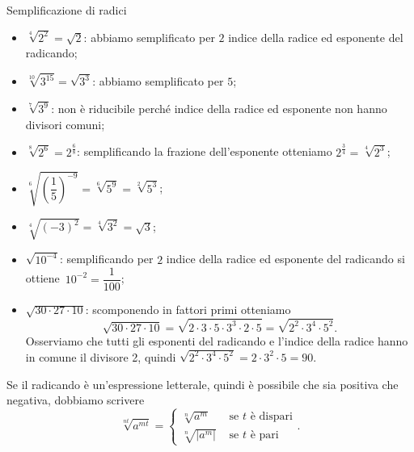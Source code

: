 \begin{exrig}
 \begin{esempio}
Semplificazione di radici
\begin{itemize}
 \item $\sqrt[4]{2^2}=\sqrt 2$: abbiamo semplificato per $2$ indice della radice ed esponente del radicando;
 \item $\sqrt[10]{3^{15}}=\sqrt{3^3}$: abbiamo semplificato per $5$;
 \item $\sqrt[7]{3^9}$: non è riducibile perché indice della radice ed esponente non hanno divisori comuni;
 \item $\sqrt[8]{2^6}=2^{\frac 6 8}$: semplificando la frazione dell'esponente otteniamo $2^{\frac 3 4}=\sqrt[4]{2^3}$;
 \item $\sqrt[6]{\left(\dfrac 1 5\right)^{-9}}=\sqrt[6]{5^9}=\sqrt[2]{5^3}$;
 \item $\sqrt[4]{(-3)^2}=\sqrt[4]{3^2}=\sqrt 3$;
 \item $\sqrt{10^{-4}}$: semplificando per $2$ indice della radice ed esponente del radicando si ottiene~$10^{-2}=\dfrac 1{100}$;
 \item $\sqrt{30\cdot 27\cdot 10}$: scomponendo in fattori primi otteniamo \[\sqrt{30\cdot 27\cdot 10}=\sqrt{2\cdot 3\cdot 5\cdot 3^3\cdot 2\cdot 5}=\sqrt{2^2\cdot 3^4\cdot 5^2}.\] Osserviamo che tutti gli esponenti del radicando e l'indice della radice hanno in comune il divisore 2, quindi $\sqrt{2^2\cdot 3^4\cdot 5^2}=2\cdot 3^2\cdot 5=90.$
\end{itemize}
\end{esempio}
\end{exrig}

Se il radicando è un'espressione letterale, quindi è possibile che sia positiva che negativa, dobbiamo scrivere
\[
\sqrt[nt]{a^{mt}}=
\begin{cases}
\sqrt[n]{a^m} & \text{ se }t\text{ è dispari}\\
\sqrt[n]{\left|a^m\right|} & \text{ se }t\text{ è pari}
\end{cases}.
\]

